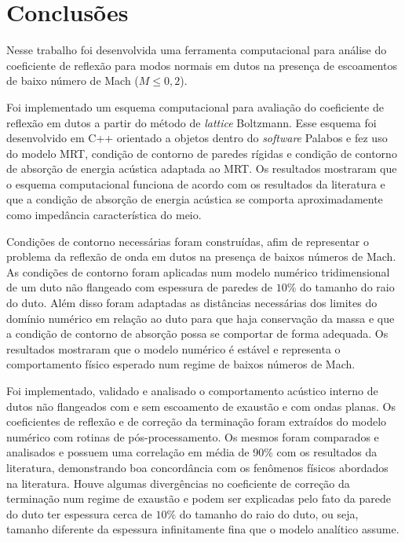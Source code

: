 \chapter{Conclusões}

Nesse trabalho foi desenvolvida uma ferramenta computacional para análise do coeficiente de reflexão para modos normais em dutos na presença de escoamentos de baixo número de Mach ($M \leq 0,2$). 

Foi implementado um esquema computacional para avaliação do coeficiente de reflexão em dutos a partir do método de \textit{lattice} Boltzmann. Esse esquema foi desenvolvido em C++ orientado a objetos dentro do \textit{software} Palabos e fez uso do modelo MRT, condição de contorno de paredes rígidas e condição de contorno de absorção de energia acústica adaptada ao MRT. Os resultados mostraram que o esquema computacional funciona de acordo com os resultados da literatura e que a condição de absorção de energia acústica se comporta aproximadamente como impedância característica do meio. 

Condições de contorno necessárias foram construídas, afim de representar o problema da reflexão de onda em dutos na presença de baixos números de Mach. As condições de contorno foram aplicadas num modelo numérico tridimensional de um duto não flangeado com espessura de paredes de $10 \%$ do tamanho do raio do duto. Além disso foram adaptadas as distâncias necessárias dos limites do domínio numérico em relação ao duto para que haja conservação da massa e que a condição de contorno de absorção possa se comportar de forma adequada. Os resultados mostraram que o modelo numérico é estável e representa o comportamento físico esperado num regime de baixos números de Mach.

Foi implementado, validado e analisado o comportamento acústico interno de dutos não flangeados com e sem escoamento de exaustão e com ondas planas. Os coeficientes de reflexão e de correção da terminação foram extraídos do modelo numérico com rotinas de pós-processamento. Os mesmos foram comparados e analisados e possuem uma correlação em média de 90\%  com os resultados da literatura, demonstrando boa concordância com os fenômenos físicos abordados na literatura. Houve algumas divergências no coeficiente de correção da terminação num regime de exaustão e podem ser explicadas pelo fato da parede do duto ter espessura cerca de $10 \%$ do tamanho do raio do duto, ou seja, tamanho diferente da espessura infinitamente fina que o modelo analítico assume. 

